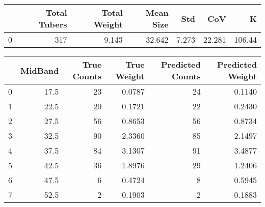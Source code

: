 \begin{tabular}{lrrrrrr}
\toprule
{} &  Total Tubers &  Total Weight &  Mean Size &    Std &     CoV &       K \\
\midrule
0 &           317 &         9.143 &     32.642 &  7.273 &  22.281 &  106.44 \\
\bottomrule
\end{tabular}

\begin{tabular}{lrrrrr}
\toprule
{} &  MidBand &  True Counts &  True Weight &  Predicted Counts &  Predicted Weight \\
\midrule
0 &     17.5 &           23 &       0.0787 &                24 &            0.1140 \\
1 &     22.5 &           20 &       0.1721 &                22 &            0.2430 \\
2 &     27.5 &           56 &       0.8653 &                56 &            0.8734 \\
3 &     32.5 &           90 &       2.3360 &                85 &            2.1497 \\
4 &     37.5 &           84 &       3.1307 &                91 &            3.4877 \\
5 &     42.5 &           36 &       1.8976 &                29 &            1.2406 \\
6 &     47.5 &            6 &       0.4724 &                 8 &            0.5945 \\
7 &     52.5 &            2 &       0.1903 &                 2 &            0.1883 \\
\bottomrule
\end{tabular}

